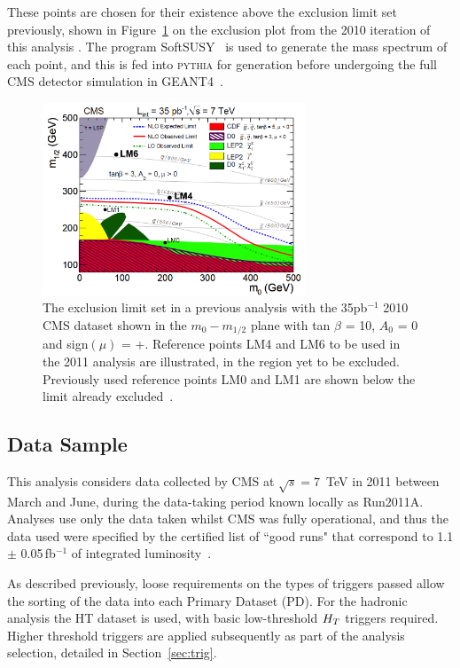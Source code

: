 These points are chosen for their existence above the exclusion limit set previously, shown in Figure~\ref{fig:lm35limit} on the exclusion plot from the 2010 iteration of this analysis \cite{35paper}. The program SoftSUSY~\cite{softsusy} is used to generate the mass spectrum of each point, and this is fed into \textsc{pythia} for generation before undergoing the full CMS detector simulation in GEANT4~\cite{GEANT4}.

\begin{figure}[htbp]
\centering
\includegraphics[width=0.70\textwidth]{Figures/Analysis/LM46on35limit}
\caption[The exclusion limit set in a previous analysis with the 35\,pb$^{-1}$ 2010 CMS dataset shown in the $m_{0}-m_{1/2}$ plane with tan $\beta$ = 10, $A_{0}$ = 0 and sign$(\mu)$ = +.]{\label{fig:lm35limit}The exclusion limit set in a previous analysis with the 35pb$^{-1}$ 2010 CMS dataset shown in the $m_{0}-m_{1/2}$ plane with tan $\beta$ = 10, $A_{0}$ = 0 and sign$(\mu)$ = +. Reference points LM4 and LM6 to be used in the 2011 analysis are illustrated, in the region yet to be excluded. Previously used reference points LM0 and LM1 are shown below the limit already excluded~\cite{35paper}.}
\end{figure}

\subsection{Data Sample}
\label{sec:datasam}
This analysis considers data collected by CMS at $\sqrt{s} = 7$~TeV in 2011 between March and June, during the data-taking period known locally as Run2011A. Analyses use only the data taken whilst CMS was fully operational, and thus the data used were specified by the certified list of ``good runs" that correspond to 1.1 $\pm$ 0.05\,fb$^{-1}$ of integrated luminosity~\cite{EWK-11-001}.

As described previously, loose requirements on the types of triggers passed allow the sorting of the data into each Primary Dataset (PD). For the hadronic analysis the HT dataset is used, with basic low-threshold $H_{T}$ triggers required. Higher threshold triggers are applied subsequently as part of the analysis selection, detailed in Section~\ref{sec:trig}.

